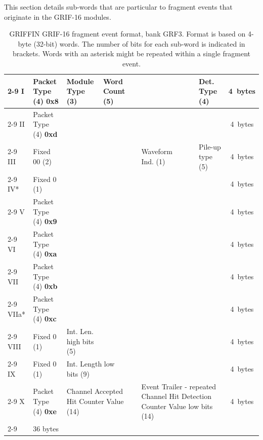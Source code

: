 \documentclass[letterpaper,12pt,notitlepage]{report}
\begin{document}
This section details sub-words that are particular to fragment events that originate in the GRIF-16 modules.
\begin{landscape}
\begin{table}
\caption{GRIFFIN GRIF-16 fragment event format, bank GRF3. Format is based on 4-byte (32-bit) words. The number of bits for each sub-word is indicated in brackets. Words with an asterisk might be repeated within a single fragment event.}
\begin{tabular*}{\textwidth}{p{0.9cm}|p{2.25cm}|p{2.2cm}|p{2.2cm}|p{2.2cm}|p{2.2cm}|p{2.2cm}|p{2.2cm}|p{2.2cm}|c}
\cline{2-9}
I& Packet Type (4) {\bf 0x8} & Module Type (3) & Word Count (5) & \multicolumn{4}{p{8.8cm}|}{\centering{Address (16)}} & Det. Type (4) & 4~bytes\\
\cline{2-9}
II & Packet Type (4) {\bf 0xd} & \multicolumn{7}{p{15.4cm}|}{\centering{Network Packet Counter Value (28)}} & 4~bytes\\
\cline{2-9}
III & Fixed 00 (2) & \multicolumn{3}{p{6.6cm}|}{\centering{Filter Patterns (14)}} & Waveform Ind. (1) & \multicolumn{2}{p{4.4cm}|}{\centering{reserved (10)}} & Pile-up type (5) & 4~bytes\\
\cline{2-9}
IV* & Fixed 0 (1) & \multicolumn{7}{p{15.4cm}|}{\centering{Filter Condition Counter Value (31)}} & 4~bytes\\
\cline{2-9}
V & Packet Type (4) {\bf 0x9} & \multicolumn{7}{p{15.4cm}|}{\centering{Channel Hit Detection Counter Value (28)}} & 4~bytes\\
\cline{2-9}
VI & Packet Type (4) {\bf 0xa} & \multicolumn{7}{p{15.4cm}|}{\centering{Time Stamp low bits (28)}} & 4~bytes\\
\cline{2-9}
VII & Packet Type (4) {\bf 0xb} & \multicolumn{3}{p{6.6cm}|}{\centering{Deadtime (14)}} & \multicolumn{4}{p{8.8cm}|}{\centering{Time Stamp high bits (14)}} & 4~bytes\\
\cline{2-9}
VIIa* & Packet Type (4) {\bf 0xc} & \multicolumn{7}{p{15.4cm}|}{\centering{Waveform Sample (28)}} & 4~bytes\\
\cline{2-9}
VIII & Fixed 0 (1) & Int. Len. high bits (5) & \multicolumn{6}{p{13.2cm}|}{\centering{Pulse Height (26)}} & 4~bytes\\
\cline{2-9}
IX & Fixed 0 (1) & \multicolumn{2}{p{4.4cm}|}{Int. Length low bits (9)} & \multicolumn{5}{p{11.0cm}|}{\centering{CFD (22)}} & 4~bytes\\
\cline{2-9}
X & Packet Type (4) {\bf 0xe} & \multicolumn{3}{p{6.6cm}|}{Channel Accepted Hit Counter Value (14)} & \multicolumn{4}{p{8.8cm}|}{Event Trailer - repeated Channel Hit Detection Counter Value low bits (14)} & 4~bytes\\
\cline{2-9}
\multicolumn{9}{r}{Total one hit:} & 36 bytes\\
\end{tabular*}
\end{table}
\end{landscape}
\end{document}
